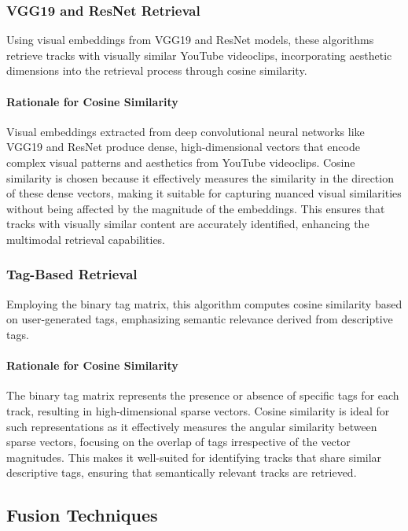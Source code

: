 \documentclass[sigconf]{acmart}
\begin{document}
\subsubsection{VGG19 and ResNet Retrieval}
Using visual embeddings from VGG19 and ResNet models, these algorithms retrieve tracks with visually similar YouTube videoclips, incorporating aesthetic dimensions into the retrieval process through cosine similarity.

\paragraph{Rationale for Cosine Similarity}
Visual embeddings extracted from deep convolutional neural networks like VGG19 and ResNet produce dense, high-dimensional vectors that encode complex visual patterns and aesthetics from YouTube videoclips. Cosine similarity is chosen because it effectively measures the similarity in the direction of these dense vectors, making it suitable for capturing nuanced visual similarities without being affected by the magnitude of the embeddings. This ensures that tracks with visually similar content are accurately identified, enhancing the multimodal retrieval capabilities.

\subsubsection{Tag-Based Retrieval}
Employing the binary tag matrix, this algorithm computes cosine similarity based on user-generated tags, emphasizing semantic relevance derived from descriptive tags.

\paragraph{Rationale for Cosine Similarity}
The binary tag matrix represents the presence or absence of specific tags for each track, resulting in high-dimensional sparse vectors. Cosine similarity is ideal for such representations as it effectively measures the angular similarity between sparse vectors, focusing on the overlap of tags irrespective of the vector magnitudes. This makes it well-suited for identifying tracks that share similar descriptive tags, ensuring that semantically relevant tracks are retrieved.


\subsection{Fusion Techniques}
\label{subsec:fusion_techniques}
\end{document}
